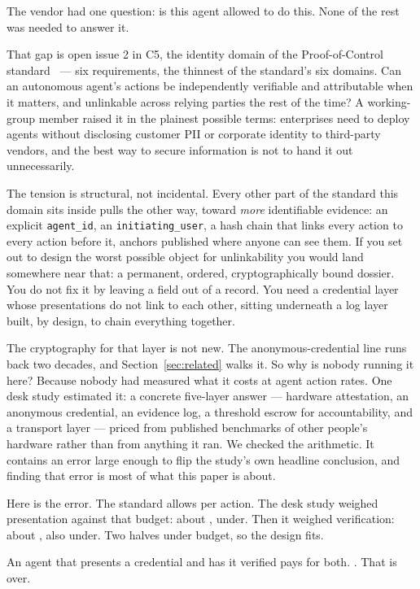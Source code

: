 \documentclass[11pt]{article}
\newcommand{\ub}{\_\allowbreak}
\begin{document}
The vendor had one question: is this agent allowed to do this. None of the
rest was needed to answer it.

That gap is open issue 2 in C5, the identity domain of the Proof-of-Control
standard~\cite{povocopenissues} --- six requirements, the thinnest of the
standard's six domains. Can an autonomous agent's actions be independently
verifiable and attributable when it matters, and unlinkable across relying
parties the rest of the time? A working-group member raised it in the
plainest possible terms: enterprises need to deploy agents without disclosing
customer PII or corporate identity to third-party vendors, and the best way
to secure information is not to hand it out unnecessarily.

The tension is structural, not incidental. Every other part of the standard
this domain sits inside pulls the other way, toward \emph{more} identifiable
evidence: an explicit \texttt{agent\ub id}, an \texttt{initiating\ub user}, a
hash chain that links every action to every action before it, anchors
published where anyone can see them. If you set out to design the worst
possible object for unlinkability you would land somewhere near that: a
permanent, ordered, cryptographically bound dossier. You do not fix it by
leaving a field out of a record. You need a credential layer whose
presentations do not link to each other, sitting underneath a log layer
built, by design, to chain everything together.

The cryptography for that layer is not new. The anonymous-credential line
runs back two decades, and Section~\ref{sec:related} walks it. So why is
nobody running it here? Because nobody had measured what it costs at agent
action rates. One desk study estimated it: a concrete five-layer answer ---
hardware attestation, an anonymous credential, an evidence log, a threshold
escrow for accountability, and a transport layer --- priced from published
benchmarks of other people's hardware rather than from anything it ran. We
checked the arithmetic. It contains an error large enough to flip the study's
own headline conclusion, and finding that error is most of what this paper is
about.

Here is the error. The standard allows \deskbudget{} per action. The desk
study weighed presentation against that budget: about \deskpresentnaive{},
under. Then it weighed verification: about \deskverifynaive{}, also under.
Two halves under budget, so the design fits.

An agent that presents a credential and has it verified pays for both.
\desktotalnaive{}. That is over.
\end{document}

